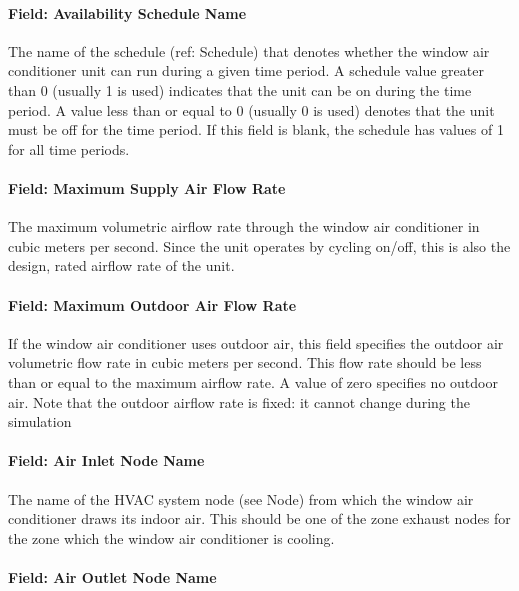 \paragraph{Field: Availability Schedule Name}\label{field-availability-schedule-name-6-005}

The name of the schedule (ref: Schedule) that denotes whether the window air conditioner unit can run during a given time period. A schedule value greater than 0 (usually 1 is used) indicates that the unit can be on during the time period. A value less than or equal to 0 (usually 0 is used) denotes that the unit must be off for the time period. If this field is blank, the schedule has values of 1 for all time periods.

\paragraph{Field: Maximum Supply Air Flow Rate}\label{field-maximum-supply-air-flow-rate-3}

The maximum volumetric airflow rate through the window air conditioner in cubic meters per second. Since the unit operates by cycling on/off, this is also the design, rated airflow rate of the unit.

\paragraph{Field: Maximum Outdoor Air Flow Rate}\label{field-maximum-outdoor-air-flow-rate-2-000}

If the window air conditioner uses outdoor air, this field specifies the outdoor air volumetric flow rate in cubic meters per second. This flow rate should be less than or equal to the maximum airflow rate. A value of zero specifies no outdoor air. Note that the outdoor airflow rate is fixed: it cannot change during the simulation

\paragraph{Field: Air Inlet Node Name}\label{field-air-inlet-node-name-4-002}

The name of the HVAC system node (see Node) from which the window air conditioner draws its indoor air. This should be one of the zone exhaust nodes for the zone which the window air conditioner is cooling.

\paragraph{Field: Air Outlet Node Name}\label{field-air-outlet-node-name-4-002}


